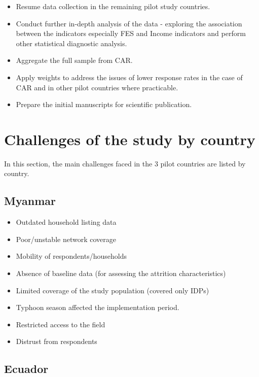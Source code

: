 \documentclass[11pt,harvard]{article}
\begin{document}
\begin{itemize}[label=--, left=2.75em]
	\item[1.] Resume data collection in the remaining pilot study countries.
	\item[2.] Conduct further in-depth analysis of the data - exploring the association between the indicators especially FES and Income indicators and perform other statistical diagnostic analysis. 
	\item[3.] Aggregate the full sample from CAR.
	\item[4.] Apply weights to address the issues of lower response rates in the case of CAR and in other pilot countries where practicable.
	\item[5.] Prepare the initial manuscripts for scientific publication.	
\end{itemize} 


\pagebreak
	
	
\section{Challenges of the study by country}
	
In this section, the main challenges faced in the 3 pilot countries are listed by country. 
	
\subsection{Myanmar}
	
	\begin{itemize}[label=--, left=1.5em]
		\item[1.] Outdated household listing data
		\item[2.] Poor/unstable network coverage
		\item[3.] Mobility of respondents/households
		\item[4.] Absence of baseline data (for assessing the attrition characteristics) 
		\item[5.] Limited coverage of the study population (covered only IDPs)
		\item[6.] Typhoon season affected the implementation period.
		\item[7.] Restricted access to the field
		\item[8.] Distrust from respondents
	\end{itemize}
	
	
\subsection{Ecuador}
	
\end{document}

